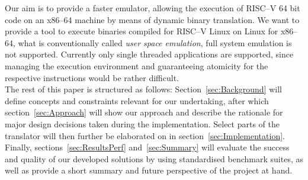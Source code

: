 Our aim is to provide a faster emulator, allowing the execution of RISC--V 64 bit code on an x86--64 machine by means of dynamic binary translation.
We want to provide a tool to execute binaries compiled for RISC--V Linux on Linux for x86--64, what is conventionally called \textit{user space emulation}, full system emulation is not supported.
Currently only single threaded applications are supported, since managing the execution environment and guaranteeing atomicity for the respective instructions would be rather difficult.\\

The rest of this paper is structured as follows:
Section~\ref{sec:Background} will define concepts and constraints relevant for our undertaking, after which section~\ref{sec:Approach} will show our approach and describe the rationale for major design decisions taken during the implementation.
Select parts of the translator will then further be elaborated on in section~\ref{sec:Implementation}.
Finally, sections~\ref{sec:ResultsPerf} and~\ref{sec:Summary} will evaluate the success and quality of our developed solutions by using standardised benchmark suites, as well as provide a short summary and future perspective of the project at hand.














